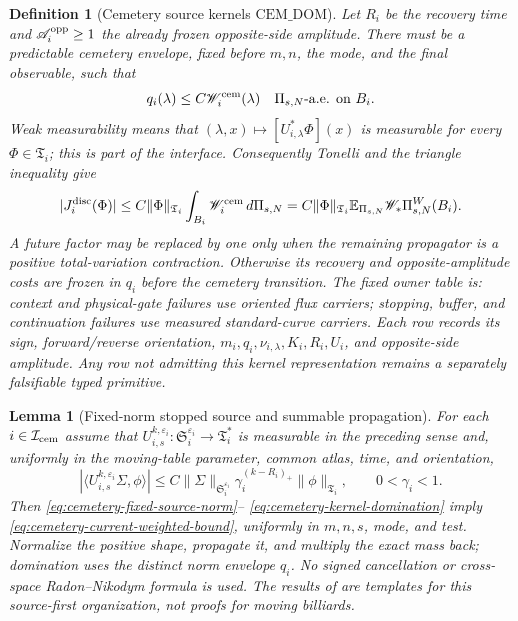 \documentclass[11pt]{article}
\newtheorem{lemma}[theorem]{Lemma}
\newtheorem{definition}[theorem]{Definition}
\begin{document}
\begin{definition}[Cemetery source kernels
$\mathrm{CEM\_DOM}$]
Let $R_i$ be the recovery time and
$\mathscr A_i^{\rm opp}\ge1$ the already frozen opposite-side amplitude.
There must be a predictable cemetery envelope, fixed before $m,n$, the mode,
and the final observable, such that
\begin{equation}
\label{eq:cemetery-kernel-domination}
 q_i(\lambda)\le C\mathscr W_i^{\rm cem}(\lambda)
 \quad\Pi_{s,N}\text{-a.e. on }B_i.
\end{equation}
Weak measurability means that
$(\lambda,x)\mapsto[U_{i,\lambda}^{*}\Phi](x)$ is measurable for every
$\Phi\in\mathfrak T_i$; this is part of the interface.  Consequently
Tonelli and the triangle inequality give
\begin{equation}
\label{eq:cemetery-current-weighted-bound}
 |J_i^{\rm disc}(\Phi)|
 \le C\|\Phi\|_{\mathfrak T_i}
       \int_{B_i}\mathscr W_i^{\rm cem}\,d\Pi_{s,N}
 =C\|\Phi\|_{\mathfrak T_i}
   \mathbb E_{\Pi_{s,N}}\mathscr W_*\Pi_{s,N}^{W}(B_i).
\end{equation}
A future factor may be replaced by one only when the remaining propagator is
a positive total-variation contraction.  Otherwise its recovery and
opposite-amplitude costs are frozen in $q_i$ before the cemetery transition.
The fixed owner table is: context and physical-gate failures use oriented
flux carriers; stopping, buffer, and continuation failures use measured
standard-curve carriers.  Each row records its sign, forward/reverse
orientation, $m_i,q_i,\nu_{i,\lambda},K_i,R_i,U_i$, and opposite-side
amplitude.
Any row not admitting this kernel representation remains a separately
falsifiable typed primitive.
\end{definition}

\begin{lemma}[Fixed-norm stopped source and summable propagation]
\label{lem:stopped-source-propagation}
For each $i\in\mathcal I_{\rm cem}$ assume that
$U_{i,s}^{k,\varepsilon_i}:\mathfrak S_i^{\varepsilon_i}\to
\mathfrak T_i^*$ is measurable in the preceding sense and, uniformly in the
moving-table parameter, common atlas, time, and orientation,
\begin{equation}
\label{eq:stopped-source-propagation}
 |\langle U_{i,s}^{k,\varepsilon_i}\Sigma,\phi\rangle|
 \le C\|\Sigma\|_{\mathfrak S_i^{\varepsilon_i}}
       \gamma_i^{(k-R_i)_+}\|\phi\|_{\mathfrak T_i},
 \qquad 0<\gamma_i<1.
\end{equation}
Then \eqref{eq:cemetery-fixed-source-norm}--
\eqref{eq:cemetery-kernel-domination} imply
\eqref{eq:cemetery-current-weighted-bound}, uniformly in $m,n,s$, mode, and
test.  Normalize the positive shape, propagate it, and multiply the exact
mass back; domination uses the distinct norm envelope $q_i$.  No signed
cancellation or cross-space Radon--Nikodym formula is
used.  The results of \cite{CanestrariPerturb,CanestrariHoles} are templates
for this source-first organization, not proofs for moving billiards.
\end{lemma}
\end{document}
